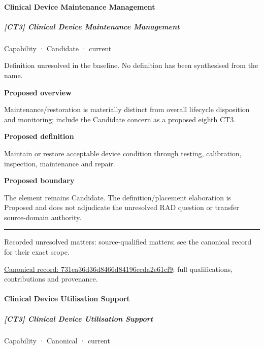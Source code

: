 \paragraph{Clinical Device Maintenance Management}

\subparagraph{[CT3] Clinical Device Maintenance Management}

\label{element:731ea36d36d8466d84196ccda2e61cf9}
{\small Capability · Candidate · current}\par

Definition unresolved in the baseline. No definition has been synthesised from the name.



\textbf{Proposed overview}



Maintenance/restoration is materially distinct from overall lifecycle disposition and monitoring; include the Candidate concern as a proposed eighth CT3.



\textbf{Proposed definition}



Maintain or restore acceptable device condition through testing, calibration, inspection, maintenance and repair.



\textbf{Proposed boundary}



The element remains Candidate. The definition/placement elaboration is Proposed and does not adjudicate the unresolved RAD question or transfer source-domain authority.



\medskip\hrule\medskip

{\small Recorded unresolved matters: source-qualified matters; see the canonical record for their exact scope.}\par
{\footnotesize \href{../../../../continuum/strategy/capability/731ea36d36d8466d84196ccda2e61cf9.md}{Canonical record: 731ea36d36d8466d84196ccda2e61cf9}; full qualifications, contributions and provenance.}\par
\paragraph{Clinical Device Utilisation Support}

\subparagraph{[CT3] Clinical Device Utilisation Support}

\label{element:0100cdb80a0c41c5930b1ca66248adf9}
{\small Capability · Canonical · current}\par

